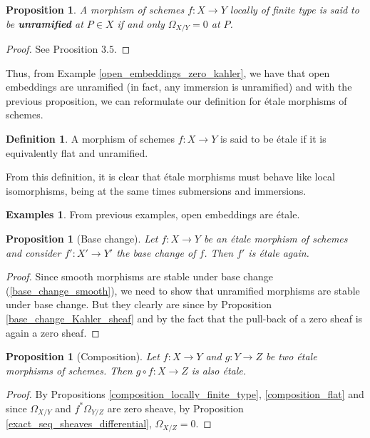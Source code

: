 \documentclass{article}
\theoremstyle{plain}
\newtheorem{proposition}[theorem]{Proposition}
\theoremstyle{definition}
\newtheorem{definition}[theorem]{Definition}
\newtheorem{examples}[theorem]{Examples}
\begin{document}
\begin{proposition}
    A morphism of schemes $f:X\rightarrow Y$ locally of finite type is said to be \textbf{unramified} at $P\in X$ if and only  $\Omega_{X/Y} = 0$ at $P$.
\end{proposition}
\begin{proof}
    See \cite{milneEtCoH} Proosition $3.5$.
\end{proof}
\noindent Thus, from Example \ref{open_embeddings_zero_kahler}, we have that open embeddings are unramified (in fact, any immersion is unramified) and with the previous proposition, we can reformulate our definition for \'etale morphisms of schemes.

\begin{definition}
\label{etale=flat+unramified}
    A morphism of schemes $f:X\rightarrow Y$ is said to be \'etale if it is equivalently flat and unramified.
\end{definition}
\noindent From this definition, it is clear that \'etale morphisms must behave like local isomorphisms, being at the same times submersions and immersions.

\begin{examples}
    From previous examples, open embeddings are \'etale.
\end{examples}





\begin{proposition}[Base change]
\label{base_change_etale}
    Let $f: X\rightarrow Y$ be an \'etale morphism of schemes and consider $f' : X' \rightarrow Y'$ the base change of $f$.
    Then $f'$ is \'etale again.
\end{proposition}
\begin{proof}
    Since smooth morphisms are stable under base change (\ref{base_change_smooth}), we need to show that unramified morphisms are stable under base change.
    But they clearly are since by Proposition \ref{base_change_Kahler_sheaf} and by the fact that the pull-back of a zero sheaf is again a zero sheaf.
\end{proof}

\begin{proposition}[Composition]
\label{composition_etale}
    Let $f:X\rightarrow Y$ and $g:Y \rightarrow Z$ be two \'etale morphisms of schemes. Then $g\circ f:X\rightarrow Z$ is also \'etale.
\end{proposition}
\begin{proof}
    By Propositions \ref{composition_locally_finite_type}, \ref{composition_flat} 
    and since $\Omega_{X/Y}$ and $f^*\Omega_{Y/Z}$ are zero sheave, by Proposition \ref{exact_seq_sheaves_differential}, $\Omega_{X/Z}= 0$.
\end{proof}
\end{document}
